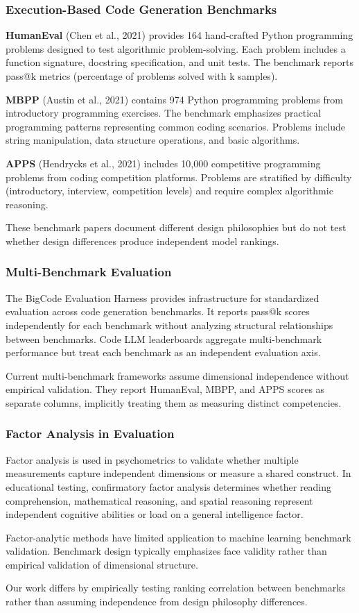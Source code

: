 
\subsubsection{Execution-Based Code Generation Benchmarks}

\textbf{HumanEval} (Chen et al., 2021) provides 164 hand-crafted Python programming problems designed to test algorithmic problem-solving. Each problem includes a function signature, docstring specification, and unit tests. The benchmark reports pass@k metrics (percentage of problems solved with k samples).

\textbf{MBPP} (Austin et al., 2021) contains 974 Python programming problems from introductory programming exercises. The benchmark emphasizes practical programming patterns representing common coding scenarios. Problems include string manipulation, data structure operations, and basic algorithms.

\textbf{APPS} (Hendrycks et al., 2021) includes 10,000 competitive programming problems from coding competition platforms. Problems are stratified by difficulty (introductory, interview, competition levels) and require complex algorithmic reasoning.

These benchmark papers document different design philosophies but do not test whether design differences produce independent model rankings.

\subsubsection{Multi-Benchmark Evaluation}

The BigCode Evaluation Harness provides infrastructure for standardized evaluation across code generation benchmarks. It reports pass@k scores independently for each benchmark without analyzing structural relationships between benchmarks. Code LLM leaderboards aggregate multi-benchmark performance but treat each benchmark as an independent evaluation axis.

Current multi-benchmark frameworks assume dimensional independence without empirical validation. They report HumanEval, MBPP, and APPS scores as separate columns, implicitly treating them as measuring distinct competencies.

\subsubsection{Factor Analysis in Evaluation}

Factor analysis is used in psychometrics to validate whether multiple measurements capture independent dimensions or measure a shared construct. In educational testing, confirmatory factor analysis determines whether reading comprehension, mathematical reasoning, and spatial reasoning represent independent cognitive abilities or load on a general intelligence factor.

Factor-analytic methods have limited application to machine learning benchmark validation. Benchmark design typically emphasizes face validity rather than empirical validation of dimensional structure.

Our work differs by empirically testing ranking correlation between benchmarks rather than assuming independence from design philosophy differences.
